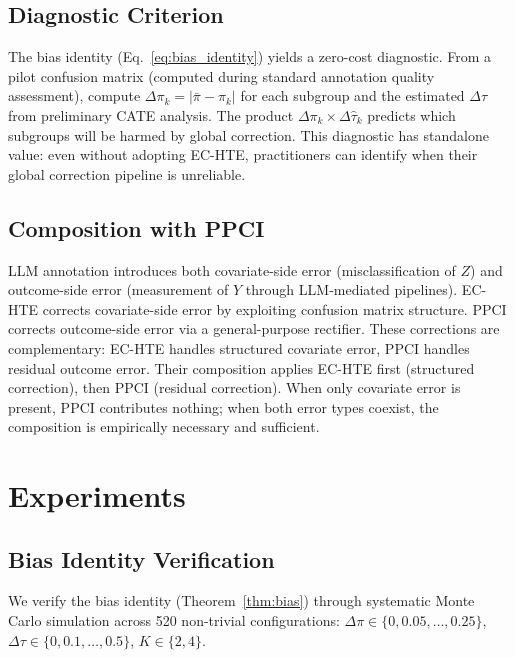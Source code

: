 \documentclass[11pt,twocolumn]{article}
\begin{document}
\subsection{Diagnostic Criterion}
\label{sec:diagnostic}

The bias identity (Eq.~\ref{eq:bias_identity}) yields a zero-cost diagnostic. From a pilot confusion matrix (computed during standard annotation quality assessment), compute $\Delta\pi_k = |\bar{\pi} - \pi_k|$ for each subgroup and the estimated $\Delta\tau$ from preliminary CATE analysis. The product $\Delta\pi_k \times \Delta\hat{\tau}_k$ predicts which subgroups will be harmed by global correction. This diagnostic has standalone value: even without adopting EC-HTE, practitioners can identify when their global correction pipeline is unreliable.

\subsection{Composition with PPCI}
\label{sec:ppci_method}

LLM annotation introduces both covariate-side error (misclassification of $Z$) and outcome-side error (measurement of $Y$ through LLM-mediated pipelines). EC-HTE corrects covariate-side error by exploiting confusion matrix structure. PPCI \cite{sui2026} corrects outcome-side error via a general-purpose rectifier. These corrections are complementary: EC-HTE handles structured covariate error, PPCI handles residual outcome error. Their composition applies EC-HTE first (structured correction), then PPCI (residual correction). When only covariate error is present, PPCI contributes nothing; when both error types coexist, the composition is empirically necessary and sufficient.

\section{Experiments}
\label{sec:experiments}

\subsection{Bias Identity Verification}
\label{sec:bias_verify}

We verify the bias identity (Theorem~\ref{thm:bias}) through systematic Monte Carlo simulation across 520 non-trivial configurations: $\Delta\pi \in \{0, 0.05, \ldots, 0.25\}$, $\Delta\tau \in \{0, 0.1, \ldots, 0.5\}$, $K \in \{2, 4\}$.
\end{document}

